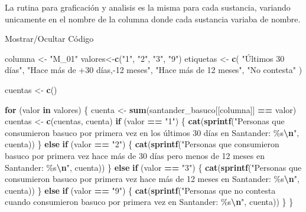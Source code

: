 \documentclass[
]{article}
\newenvironment{Shaded}{\begin{snugshade}}{\end{snugshade}}
\newcommand{\ControlFlowTok}[1]{\textcolor[rgb]{0.13,0.29,0.53}{\textbf{#1}}}
\newcommand{\FunctionTok}[1]{\textcolor[rgb]{0.13,0.29,0.53}{\textbf{#1}}}
\newcommand{\NormalTok}[1]{#1}
\newcommand{\OtherTok}[1]{\textcolor[rgb]{0.56,0.35,0.01}{#1}}
\newcommand{\SpecialCharTok}[1]{\textcolor[rgb]{0.81,0.36,0.00}{\textbf{#1}}}
\newcommand{\StringTok}[1]{\textcolor[rgb]{0.31,0.60,0.02}{#1}}
\begin{document}
La rutina para graficación y analisis es la misma para cada sustancia,
variando unicamente en el nombre de la columna donde cada sustancia
variaba de nombre.

Mostrar/Ocultar Código

\begin{Shaded}
\begin{Highlighting}[]
\NormalTok{columna }\OtherTok{\textless{}{-}} \StringTok{"M\_01"}
\NormalTok{valores}\OtherTok{\textless{}{-}}\FunctionTok{c}\NormalTok{(}\StringTok{"1"}\NormalTok{, }\StringTok{"2"}\NormalTok{, }\StringTok{"3"}\NormalTok{, }\StringTok{"9"}\NormalTok{)}
\NormalTok{etiquetas }\OtherTok{\textless{}{-}} \FunctionTok{c}\NormalTok{(}
  \StringTok{"Últimos 30 días"}\NormalTok{,}
  \StringTok{"Hace más de +30 días,{-}12 meses"}\NormalTok{,}
  \StringTok{"Hace más de 12 meses"}\NormalTok{,}
  \StringTok{"No contesta"}
\NormalTok{)}

\NormalTok{cuentas }\OtherTok{\textless{}{-}} \FunctionTok{c}\NormalTok{()}

\ControlFlowTok{for}\NormalTok{ (valor }\ControlFlowTok{in}\NormalTok{ valores) \{}
\NormalTok{  cuenta }\OtherTok{\textless{}{-}} \FunctionTok{sum}\NormalTok{(santander\_basuco[[columna]] }\SpecialCharTok{==}\NormalTok{ valor)}
\NormalTok{  cuentas }\OtherTok{\textless{}{-}} \FunctionTok{c}\NormalTok{(cuentas, cuenta) }
  \ControlFlowTok{if}\NormalTok{ (valor }\SpecialCharTok{==} \StringTok{"1"}\NormalTok{) \{}
    \FunctionTok{cat}\NormalTok{(}\FunctionTok{sprintf}\NormalTok{(}\StringTok{"Personas que consumieron basuco por primera vez en los últimos 30 días en Santander: \%s}\SpecialCharTok{\textbackslash{}n}\StringTok{"}\NormalTok{, cuenta))}
\NormalTok{  \} }\ControlFlowTok{else} \ControlFlowTok{if}\NormalTok{ (valor }\SpecialCharTok{==} \StringTok{"2"}\NormalTok{) \{}
    \FunctionTok{cat}\NormalTok{(}\FunctionTok{sprintf}\NormalTok{(}\StringTok{"Personas que consumieron basuco por primera vez hace más de 30 días pero menos de 12 meses en Santander: \%s}\SpecialCharTok{\textbackslash{}n}\StringTok{"}\NormalTok{, cuenta))}
\NormalTok{  \} }\ControlFlowTok{else} \ControlFlowTok{if}\NormalTok{ (valor }\SpecialCharTok{==} \StringTok{"3"}\NormalTok{) \{}
    \FunctionTok{cat}\NormalTok{(}\FunctionTok{sprintf}\NormalTok{(}\StringTok{"Personas que consumieron basuco por primera vez hace más de 12 meses en Santander: \%s}\SpecialCharTok{\textbackslash{}n}\StringTok{"}\NormalTok{, cuenta))}
\NormalTok{  \} }\ControlFlowTok{else} \ControlFlowTok{if}\NormalTok{ (valor }\SpecialCharTok{==} \StringTok{"9"}\NormalTok{) \{}
    \FunctionTok{cat}\NormalTok{(}\FunctionTok{sprintf}\NormalTok{(}\StringTok{"Personas que no contesta cuando consumieron basuco por primera vez en Santander: \%s}\SpecialCharTok{\textbackslash{}n}\StringTok{"}\NormalTok{, cuenta))}
\NormalTok{  \}}
\NormalTok{\}}


\end{Highlighting}
\end{Shaded}
\end{document}
